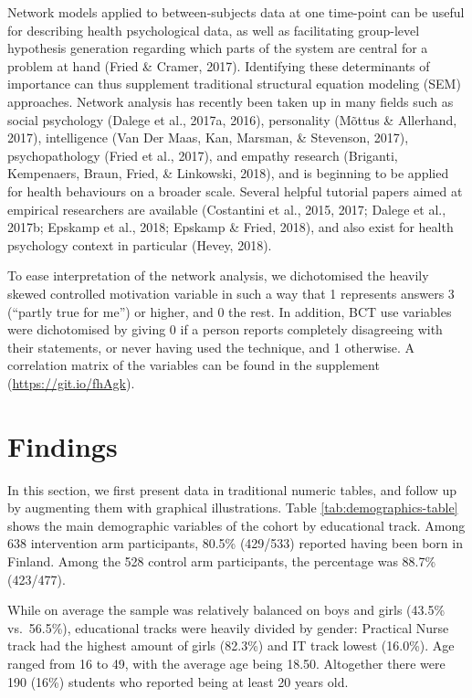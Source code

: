 \documentclass[british,man]{apa6}
\begin{document}
Network models applied to between-subjects data at one time-point can be useful for describing health psychological data, as well as facilitating group-level hypothesis generation regarding which parts of the system are central for a problem at hand (Fried \& Cramer, 2017). Identifying these determinants of importance can thus supplement traditional structural equation modeling (SEM) approaches. Network analysis has recently been taken up in many fields such as social psychology (Dalege et al., 2017a, 2016), personality (Mõttus \& Allerhand, 2017), intelligence (Van Der Maas, Kan, Marsman, \& Stevenson, 2017), psychopathology (Fried et al., 2017), and empathy research (Briganti, Kempenaers, Braun, Fried, \& Linkowski, 2018), and is beginning to be applied for health behaviours on a broader scale. Several helpful tutorial papers aimed at empirical researchers are available (Costantini et al., 2015, 2017; Dalege et al., 2017b; Epskamp et al., 2018; Epskamp \& Fried, 2018), and also exist for health psychology context in particular (Hevey, 2018).

To ease interpretation of the network analysis, we dichotomised the heavily skewed controlled motivation variable in such a way that 1 represents answers 3 (\enquote{partly true for me}) or higher, and 0 the rest. In addition, BCT use variables were dichotomised by giving 0 if a person reports completely disagreeing with their statements, or never having used the technique, and 1 otherwise. A correlation matrix of the variables can be found in the supplement (\url{https://git.io/fhAgk}).

\hypertarget{findings}{%
\section{Findings}\label{findings}}

In this section, we first present data in traditional numeric tables, and follow up by augmenting them with graphical illustrations. Table \ref{tab:demographics-table} shows the main demographic variables of the cohort by educational track. Among 638 intervention arm participants, 80.5\% (429/533) reported having been born in Finland. Among the 528 control arm participants, the percentage was 88.7\% (423/477).

While on average the sample was relatively balanced on boys and girls (43.5\% vs.~56.5\%), educational tracks were heavily divided by gender: Practical Nurse track had the highest amount of girls (82.3\%) and IT track lowest (16.0\%). Age ranged from 16 to 49, with the average age being 18.50. Altogether there were 190 (16\%) students who reported being at least 20 years old.
\end{document}
